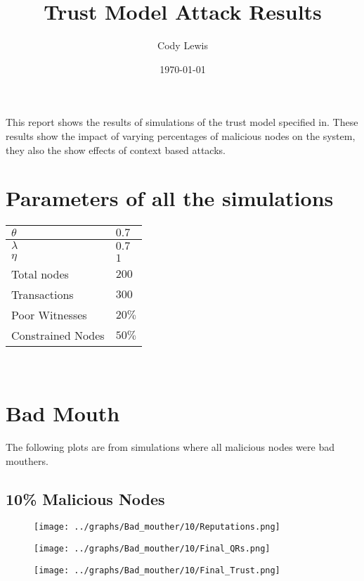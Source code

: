\documentclass{article}
\title{Trust Model Attack Results}
\author{Cody Lewis}
\date{\today}
\begin{document}
  \maketitle
  This report shows the results of simulations of the trust model specified
  in\cite{saied13}. These results show the impact of varying percentages of
  malicious nodes on the system, they also the show effects of context based
  attacks.
  \section*{Parameters of all the simulations}
    \begin{tabularx}{\textwidth}{X X}
        \toprule
        $ \theta{} $ & $ 0.7 $ \\
        \midrule
        $ \lambda{} $ & $ 0.7 $ \\
        \midrule
        $ \eta{} $ & $ 1 $ \\
        \midrule
        Total nodes & $ 200 $ \\
        \midrule
        Transactions & $ 300 $ \\
        \midrule
        Poor Witnesses & $ 20\% $ \\
        \midrule
        Constrained Nodes & $ 50\% $ \\
        \bottomrule
    \end{tabularx} \\
  \newpage
  \section*{Bad Mouth}
    The following plots are from simulations where all malicious nodes were
    bad mouthers.
    \\
  \begin{minipage}[t]{0.49\columnwidth}
    \subsection*{10\% Malicious Nodes}
        \begin{figure}[H]
            \centering
            \texttt{[image: ../graphs/Bad\_mouther/10/Reputations.png]}
        \end{figure}
        \begin{figure}[H]
            \centering
            \texttt{[image: ../graphs/Bad\_mouther/10/Final\_QRs.png]}
        \end{figure}
    \end{minipage}
    \begin{minipage}[t]{0.49\columnwidth}
        \begin{figure}[H]
            \centering
            \texttt{[image: ../graphs/Bad\_mouther/10/Final\_Trust.png]}
        \end{figure}
    \end{minipage}
\end{document}

